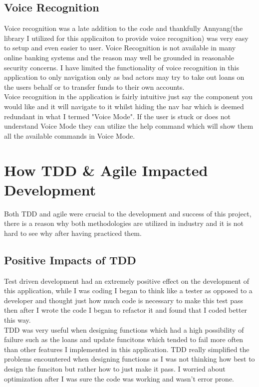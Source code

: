 \subsection{Voice Recognition}
Voice recognition was a late addition to the code and thankfully Annyang(the library I utilized for this applicaiton to provide voice recognition)\cite{Annyang} was very easy to setup and even easier to user.  Voice Recognition is not available in many online banking systems and the reason may well be grounded in reasonable security concerns.  I have limited the functionality of voice recognition in this application to only navigation only as bad actors may try to take out loans on the users behalf or to transfer funds to their own accounts.
\\
Voice recognition in the application is fairly intuitive just say the component you would like and it will navigate to it whilst hiding the nav bar which is deemed redundant in what I termed "Voice Mode".  If the user is stuck or does not understand Voice Mode they can utilize the help command which will show them all the available commands in Voice Mode.
\section{How TDD \& Agile Impacted Development}
Both TDD and agile were crucial to the development and success of this project, there is a reason why both methodologies are utilized in industry and it is not hard to see why after having practiced them.
\subsection{Positive Impacts of TDD}
Test driven development had an extremely positive effect on the development of this application, while I was coding I began to think like a tester as opposed to a developer and thought just how much code is necessary to make this test pass then after I wrote the code I began to refactor it and found that I coded better this way.
\\
TDD was very useful when designing functions which had a high possibility of failure such as the loans and update funcitons which tended to fail more often than other features I implemented in this application.  TDD really simplified the problems encountered when designing functions as I was not thinking how best to design the funciton but rather how to just make it pass.  I worried about optimization after I was sure the code was working and wasn't error prone.
